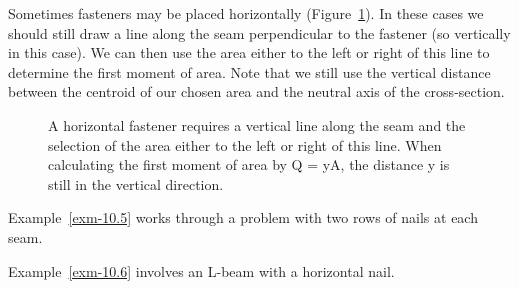 \documentclass[
  letterpaper,
  DIV=11,
  numbers=noendperiod]{scrreprt}
\theoremstyle{definition}
\theoremstyle{remark}
\begin{document}
Sometimes fasteners may be placed horizontally (Figure~\ref{fig-10.13}).
In these cases we should still draw a line along the seam perpendicular
to the fastener (so vertically in this case). We can then use the area
either to the left or right of this line to determine the first moment
of area. Note that we still use the vertical distance between the
centroid of our chosen area and the neutral axis of the cross-section.

\begin{figure}


\caption{\label{fig-10.13}A horizontal fastener requires a vertical line
along the seam and the selection of the area either to the left or right
of this line. When calculating the first moment of area by Q = yA, the
distance y is still in the vertical direction.}

\end{figure}%

Example~\ref{exm-10.5} works through a problem with two rows of nails at
each seam.

Example~\ref{exm-10.6} involves an L-beam with a horizontal nail.
\end{document}
